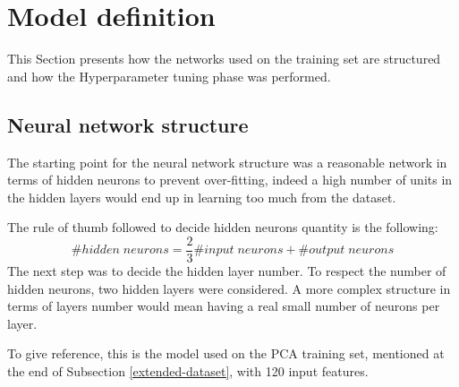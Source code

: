 \section{Model definition}
\label{model-definition}
This Section presents how the networks used on the training set are 
structured and how the Hyperparameter tuning phase was performed.

\subsection{Neural network structure}
The starting point for the neural network structure was a 
reasonable network in terms of hidden neurons to prevent over-fitting, 
indeed a high number of units in the hidden layers would end up in learning 
too much from the dataset.

The rule of thumb followed to decide hidden neurons quantity is the 
following: 
$$\#\mathit{hidden\; neurons} = \frac{2}{3}\#\mathit{input\;neurons}
+ \#\mathit{output\;neurons}$$
The next step was to decide the hidden layer number. To respect the 
number of hidden neurons, two hidden layers were considered. 
A more complex structure in terms of layers number would mean 
having a real small number of neurons per layer.

To give reference, this is the model used on the PCA training set, mentioned at 
the end of Subsection \vref{extended-dataset}, with 
120 input features.

